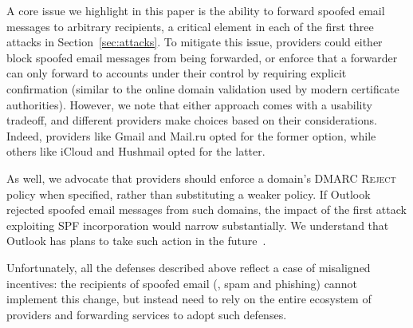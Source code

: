 A core issue we highlight in this paper is the ability to forward spoofed email messages to arbitrary recipients, a critical element in each
of the first three attacks in Section~\ref{sec:attacks}. To mitigate this issue, providers could either block spoofed email messages from being forwarded, or enforce that a forwarder can only forward to accounts under their control by requiring explicit confirmation (similar to
the online domain validation used by modern certificate authorities). However, we note that either approach comes with a usability tradeoff, and different providers make choices based on their considerations. Indeed, providers like Gmail and Mail.ru opted for the former option, while others like iCloud and Hushmail opted for the latter.







As well, we advocate that providers
should enforce a domain's DMARC \textsc{Reject} policy when specified, rather
than substituting a weaker policy.  If Outlook rejected spoofed
email messages from such domains, the impact of the first attack
exploiting SPF incorporation
would
narrow substantially. We understand that Outlook has plans to take such action in the future~\cite{hotmailreject}.


Unfortunately, all the defenses described above reflect a
case of misaligned
incentives: the recipients of spoofed email (\eg, spam and phishing)
cannot implement this change, but instead need to rely on the entire
ecosystem of providers and forwarding services to adopt such defenses. 

